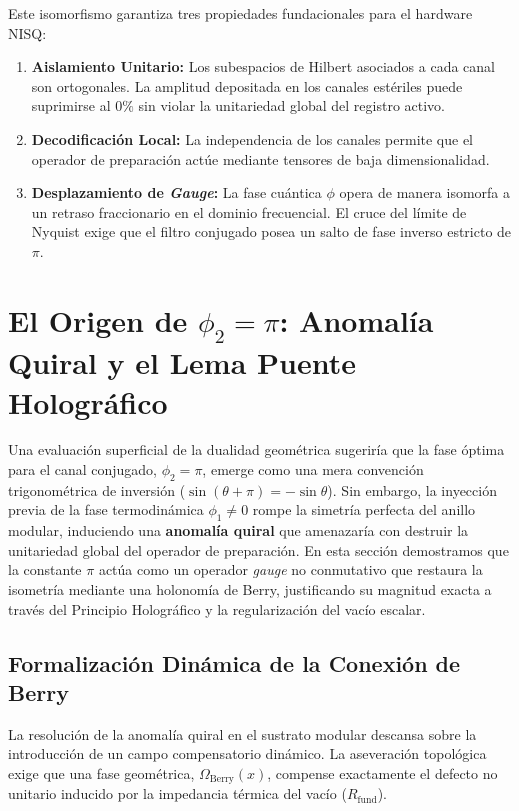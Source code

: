 \documentclass[12pt,a4paper]{article}
\theoremstyle{plain}
\theoremstyle{definition}
\theoremstyle{remark}
\begin{document}
Este isomorfismo garantiza tres propiedades fundacionales para el hardware NISQ:
\begin{enumerate}
    \item \textbf{Aislamiento Unitario:} Los subespacios de Hilbert asociados a cada canal son ortogonales. La amplitud depositada en los canales estériles puede suprimirse al $0\%$ sin violar la unitariedad global del registro activo.
    \item \textbf{Decodificación Local:} La independencia de los canales permite que el operador de preparación actúe mediante tensores de baja dimensionalidad.
    \item \textbf{Desplazamiento de \textit{Gauge}:} La fase cuántica $\phi$ opera de manera isomorfa a un retraso fraccionario en el dominio frecuencial. El cruce del límite de Nyquist exige que el filtro conjugado posea un salto de fase inverso estricto de $\pi$.
\end{enumerate}

\section{El Origen de $\phi_2 = \pi$: Anomalía Quiral y el Lema Puente Holográfico}
\label{sec:origen_pi}

Una evaluación superficial de la dualidad geométrica sugeriría que la fase óptima para el canal conjugado, $\phi_2 = \pi$, emerge como una mera convención trigonométrica de inversión ($\sin(\theta+\pi) = -\sin\theta$). Sin embargo, la inyección previa de la fase termodinámica $\phi_1 \neq 0$ rompe la simetría perfecta del anillo modular, induciendo una \textbf{anomalía quiral} que amenazaría con destruir la unitariedad global del operador de preparación. En esta sección demostramos que la constante $\pi$ actúa como un operador \textit{gauge} no conmutativo que restaura la isometría mediante una holonomía de Berry, justificando su magnitud exacta a través del Principio Holográfico y la regularización del vacío escalar.

\subsection{Formalización Dinámica de la Conexión de Berry}
\label{subsec:berry_formalism}

La resolución de la anomalía quiral en el sustrato modular descansa sobre la introducción de un campo compensatorio dinámico. La aseveración topológica exige que una fase geométrica, $\Omega_{\text{Berry}}(x)$, compense exactamente el defecto no unitario inducido por la impedancia térmica del vacío ($R_{\text{fund}}$).
\end{document}
